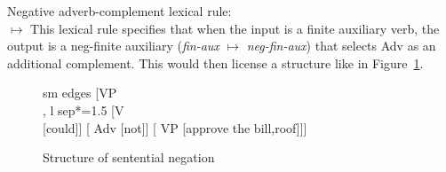 \documentclass[output=paper
                ,modfonts
                ,nonflat
	        ,collection
	        ,collectionchapter
	        ,collectiontoclongg
 	        ,biblatex
                ,babelshorthands
                ,newtxmath
                ,draftmode
                ,colorlinks, citecolor=brown
]{./langsci/langscibook}
\begin{document}
{\begin{exe}
\begin{xlist}
\begin{exe}
\begin{xlist}
\ea
Negative adverb-complement lexical rule:\\
 $\mapsto$
\z
%
This lexical rule specifies that when the input is a finite auxiliary verb,
the output is a neg-finite auxiliary (\textit{fin-aux} $\mapsto$ \textit{neg-fin-aux})
that selects Adv as an additional complement. This would then
license a structure like in Figure~\ref{negation-fig:6}.


\begin{figure}
	\begin{forest}
		sm edges
		[VP\\
		, l sep*=1.5
			[V\\
				[could]]
			[ Adv
				[not]]
			[ VP
				[approve the bill,roof]]]
	\end{forest}
\caption{Structure of sentential negation}\label{negation-fig:6}
\end{figure}


\end{xlist}
\end{exe}
\end{xlist}
\end{exe}}
\end{document}
